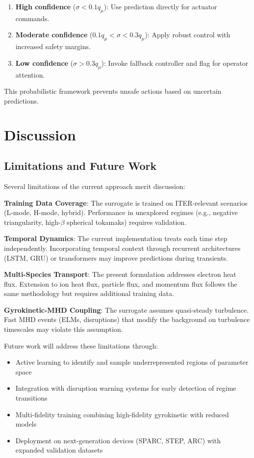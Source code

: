 \documentclass[12pt]{article}
\begin{document}
\begin{enumerate}
\item \textbf{High confidence} ($\sigma < 0.1 q_\mu$): Use prediction directly for actuator commands.

\item \textbf{Moderate confidence} ($0.1 q_\mu < \sigma < 0.3 q_\mu$): Apply robust control with increased safety margins.

\item \textbf{Low confidence} ($\sigma > 0.3 q_\mu$): Invoke fallback controller and flag for operator attention.
\end{enumerate}

This probabilistic framework prevents unsafe actions based on uncertain predictions.

\section{Discussion}

\subsection{Limitations and Future Work}

Several limitations of the current approach merit discussion:

\textbf{Training Data Coverage}: The surrogate is trained on ITER-relevant scenarios (L-mode, H-mode, hybrid). Performance in unexplored regimes (e.g., negative triangularity, high-$\beta$ spherical tokamaks) requires validation.

\textbf{Temporal Dynamics}: The current implementation treats each time step independently. Incorporating temporal context through recurrent architectures (LSTM, GRU) or transformers may improve predictions during transients.

\textbf{Multi-Species Transport}: The present formulation addresses electron heat flux. Extension to ion heat flux, particle flux, and momentum flux follows the same methodology but requires additional training data.

\textbf{Gyrokinetic-MHD Coupling}: The surrogate assumes quasi-steady turbulence. Fast MHD events (ELMs, disruptions) that modify the background on turbulence timescales may violate this assumption.

Future work will address these limitations through:
\begin{itemize}
\item Active learning to identify and sample underrepresented regions of parameter space
\item Integration with disruption warning systems for early detection of regime transitions
\item Multi-fidelity training combining high-fidelity gyrokinetic with reduced models
\item Deployment on next-generation devices (SPARC, STEP, ARC) with expanded validation datasets
\end{itemize}
\end{document}
